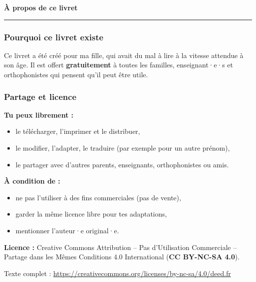 \documentclass[
  french,
  14pt,
  a4paper,
]{extarticle}
\providecommand{\tightlist}{%
  \setlength{\itemsep}{0pt}\setlength{\parskip}{0pt}}
\begin{document}
\newpage

\vspace*{2cm}
\begin{center}
{\fontsize{38pt}{44pt}\selectfont\bfseries À propos de ce livret}\\[1em]
\textcolor{accentcolor}{\rule{0.35\textwidth}{1.5pt}}
\end{center}
\vspace{1.5cm}

\subsubsection*{Pourquoi ce livret existe}

Ce livret a été créé pour ma fille, qui avait du mal à lire à la vitesse attendue à son âge. Il est offert \textbf{gratuitement} à toutes les familles, enseignant·e·s et orthophonistes qui pensent qu'il peut être utile.

\subsubsection*{Partage et licence}

\textbf{Tu peux librement :}
\begin{itemize}
\tightlist
\item le télécharger, l'imprimer et le distribuer,
\item le modifier, l'adapter, le traduire (par exemple pour un autre prénom),
\item le partager avec d'autres parents, enseignants, orthophonistes ou amis.
\end{itemize}

\textbf{À condition de :}
\begin{itemize}
\tightlist
\item ne pas l'utiliser à des fins commerciales (pas de vente),
\item garder la même licence libre pour tes adaptations,
\item mentionner l'auteur·e original·e.
\end{itemize}

\vspace{0.5em}

\textbf{Licence :} Creative Commons Attribution – Pas d'Utilisation Commerciale – Partage dans les Mêmes Conditions 4.0 International (\textbf{CC BY-NC-SA 4.0}).

{\small Texte complet : \url{https://creativecommons.org/licenses/by-nc-sa/4.0/deed.fr}}
\end{document}
